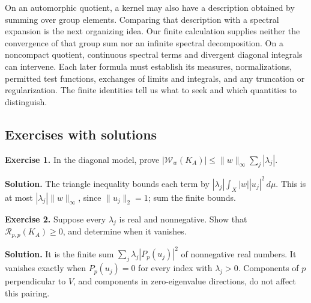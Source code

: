 On an automorphic quotient, a kernel may also have a description obtained by summing over group elements. Comparing that description with a spectral expansion is the next organizing idea. Our finite calculation supplies neither the convergence of that group sum nor an infinite spectral decomposition. On a noncompact quotient, continuous spectral terms and divergent diagonal integrals can intervene. Each later formula must establish its measures, normalizations, permitted test functions, exchanges of limits and integrals, and any truncation or regularization. The finite identities tell us what to seek and which quantities to distinguish.

\subsection{Exercises with solutions}\label{finite-pairing-exercises}

\textbf{Exercise 1.} In the diagonal model, prove
\( |\mathcal W_w(K_A)|\leq\|w\|_\infty\sum_j|\lambda_j| \).

\textbf{Solution.} The triangle inequality bounds each term by \(|\lambda_j|\int_X|w||u_j|^2\,d\mu\). This is at most \(|\lambda_j|\|w\|_\infty\), since \(\|u_j\|_2=1\); sum the finite bounds.

\textbf{Exercise 2.} Suppose every \(\lambda_j\) is real and nonnegative. Show that \(\mathcal R_{p,p}(K_A)\geq0\), and determine when it vanishes.

\textbf{Solution.} It is the finite sum \(\sum_j\lambda_j|P_p(u_j)|^2\) of nonnegative real numbers. It vanishes exactly when \(P_p(u_j)=0\) for every index with \(\lambda_j>0\). Components of \(p\) perpendicular to \(V\), and components in zero-eigenvalue directions, do not affect this pairing.
